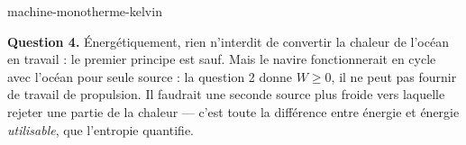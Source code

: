\begin{exo}{machine-monotherme-kelvin}
\begin{solution}
\textbf{Question 4.} Énergétiquement, rien n'interdit de convertir la chaleur de l'océan en travail : le premier principe est sauf. Mais le navire fonctionnerait en cycle avec l'océan pour seule source : la question 2 donne $W \geq 0$, il ne peut pas fournir de travail de propulsion. Il faudrait une seconde source plus froide vers laquelle rejeter une partie de la chaleur — c'est toute la différence entre énergie et énergie \emph{utilisable}, que l'entropie quantifie.
\end{solution}
\end{exo}
